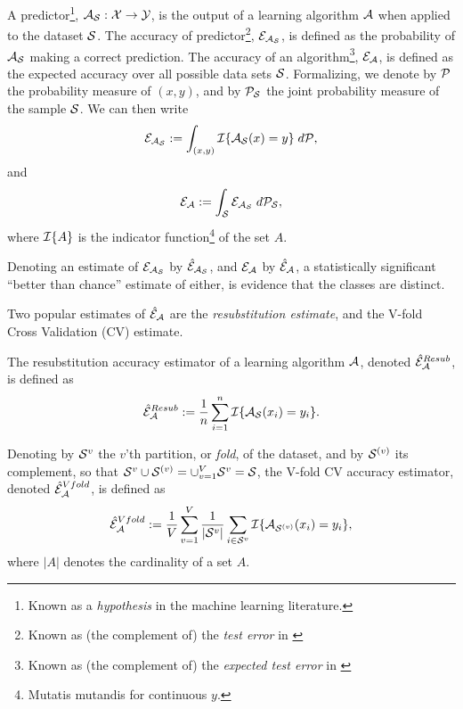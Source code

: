 \documentclass[journal]{IEEEtran}
\begin{document}
A predictor\footnote{Known as a \emph{hypothesis} in the machine learning literature.}, $\mathcal{A}_{\mathcal{S}}:\mathcal{X} \to \mathcal{Y}$, is the output of a learning algorithm $\mathcal{A}$ when applied to the dataset $\mathcal{S}$. 
The accuracy of predictor\footnote{Known as (the complement of) the \emph{test error} in \cite{hastie_elements_2003}}, $\mathcal{E}_{\mathcal{A}_{\mathcal{S}}}$, is defined as the probability of $\mathcal{A}_{\mathcal{S}}$ making a correct prediction. 
The accuracy of an algorithm\footnote{Known as (the complement of) the \emph{expected test error} in \cite{hastie_elements_2003}}, $\mathcal{E}_{\mathcal{A}}$, is defined as the expected accuracy over all possible data sets $\mathcal{S}$. 
Formalizing, we denote by $\mathcal{P}$ the probability measure of $(x, y)$, and by $\mathcal{P}_{\mathcal{S}}$ the joint probability measure of the sample $\mathcal{S}$. 
We can then write 
\begin{align}
\mathcal{E}_{\mathcal{A}_{\mathcal{S}}}:=\int_{(x,y)} \mathcal{I}{\{ \mathcal{A}_{\mathcal{S}}(x)=y \}} \; d\mathcal{P},
\end{align}
and
\begin{align}
\mathcal{E}_{\mathcal{A}}:=\int_{\mathcal{S}} \mathcal{E}_{\mathcal{A}_{\mathcal{S}}} \; d\mathcal{P}_{\mathcal{S}},
\end{align}
where $\mathcal{I}{\{ A \}}$ is the indicator function\footnote{Mutatis mutandis for continuous $y$.} of the set $A$. 

Denoting an estimate of $\mathcal{E}_{\mathcal{A}_{\mathcal{S}}}$ by $\hat{\mathcal{E}}_{\mathcal{A}_{\mathcal{S}}}$, and $\mathcal{E}_{\mathcal{A}}$ by $\hat{\mathcal{E}}_{\mathcal{A}}$, a statistically significant ``better than chance'' estimate of either, is evidence that the classes are distinct. 

Two popular estimates of $\hat{\mathcal{E}}_{\mathcal{A}}$ are the \emph{resubstitution estimate}, and the V-fold Cross Validation (CV) estimate.
\begin{definition}
	\label{def:resubstitution}
	The resubstitution accuracy estimator of a learning algorithm $\mathcal{A}$, denoted $\hat{\mathcal{E}}_{\mathcal{A}}^{Resub}$,  is defined as
	\begin{align}
	\hat{\mathcal{E}}_{\mathcal{A}}^{Resub} := \frac 1n \sum_{i=1}^{n} \mathcal{I}{\{ \mathcal{A}_{\mathcal{S}}(x_i)=y_i \}}.
	\end{align}
\end{definition}


\begin{definition}
	\label{def:v-fold}
	Denoting by $\mathcal{S}^{v}$ the $v$'th partition, or \emph{fold}, of the dataset, and by $\mathcal{S}^{(v)}$ its complement, so that $\mathcal{S}^{v} \cup \mathcal{S}^{(v)}=\cup_{v=1}^V \mathcal{S}^{v}=\mathcal{S}$, the V-fold CV accuracy estimator, denoted $\hat{\mathcal{E}}_{\mathcal{A}}^{Vfold}$, is defined as 	
	\begin{align}
	\hat{\mathcal{E}}_{\mathcal{A}}^{Vfold} := 
	\frac 1V \sum_{v=1}^{V} \frac{1}{|\mathcal{S}^v|} \sum_{i \in \mathcal{S}^{v}} \mathcal{I}{\{ \mathcal{A}_{\mathcal{S}^{(v)}}(x_i)=y_i \}},
	\end{align}
	where $|A|$ denotes the cardinality of a set $A$.
\end{definition}
\end{document}
